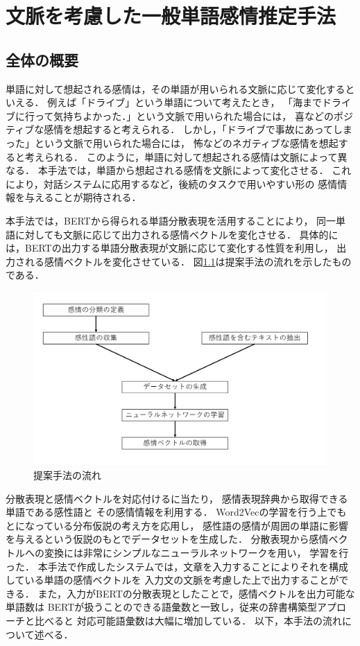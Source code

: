 \chapter{文脈を考慮した一般単語感情推定手法}	

	\section{全体の概要}
	単語に対して想起される感情は，その単語が用いられる文脈に応じて変化するといえる．
	例えば「ドライブ」という単語について考えたとき，
	「海までドライブに行って気持ちよかった．」という文脈で用いられた場合には，
	喜などのポジティブな感情を想起すると考えられる．
	しかし，「ドライブで事故にあってしまった」という文脈で用いられた場合には，
	怖などのネガティブな感情を想起すると考えられる．
	このように，単語に対して想起される感情は文脈によって異なる．
	本手法では，単語から想起される感情を文脈によって変化させる．
	これにより，対話システムに応用するなど，後続のタスクで用いやすい形の
	感情情報を与えることが期待される．

	本手法では，BERTから得られる単語分散表現を活用することにより，
	同一単語に対しても文脈に応じて出力される感情ベクトルを変化させる．
	具体的には，BERTの出力する単語分散表現が文脈に応じて変化する性質を利用し，
	出力される感情ベクトルを変化させている．
	図\ref{fig:flowchart}は提案手法の流れを示したものである．
	\begin{figure}[H]
		\centering
		\includegraphics[width=\linewidth]{./figure/flowchart.png}
		\caption{提案手法の流れ}
		\label{fig:flowchart}
	\end{figure}
	分散表現と感情ベクトルを対応付けるに当たり，
	感情表現辞典\cite{kanjou_hyogen_jiten}から取得できる単語である感性語と
	その感情情報を利用する．
	Word2Vecの学習を行う上でもとになっている分布仮説の考え方を応用し，
	感性語の感情が周囲の単語に影響を与えるという仮説のもとでデータセットを生成した．
	分散表現から感情ベクトルへの変換には非常にシンプルなニューラルネットワークを用い，
	学習を行った．
	本手法で作成したシステムでは，文章を入力することによりそれを構成している単語の感情ベクトルを
	入力文の文脈を考慮した上で出力することができる．
	また，入力がBERTの分散表現としたことで，感情ベクトルを出力可能な単語数は
	BERTが扱うことのできる語彙数と一致し，従来の辞書構築型アプローチと比べると
	対応可能語彙数は大幅に増加している．
	以下，本手法の流れについて述べる．



